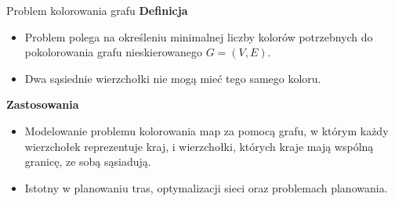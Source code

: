 \begin{frame}{Problem kolorowania grafu}
\textbf{Definicja}
\begin{itemize}
	\item Problem polega na określeniu minimalnej liczby kolorów potrzebnych do pokolorowania grafu nieskierowanego $G = (V, E)$.
	\item Dwa sąsiednie wierzchołki nie mogą mieć tego samego koloru.	
\end{itemize}
\vspace{10pt}

\textbf{Zastosowania}
\begin{itemize}
	\item Modelowanie problemu kolorowania map za pomocą grafu, w którym każdy wierzchołek reprezentuje kraj, i wierzchołki, których kraje mają wspólną granicę, ze sobą sąsiadują.
	\item Istotny w planowaniu tras, optymalizacji sieci oraz problemach planowania.
\end{itemize}
\end{frame}